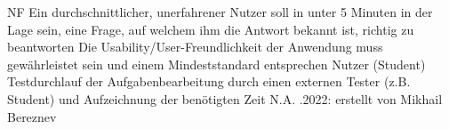\begin{myreq}
    \threeinline
    {\reqno}
    {\reqtype NF}
    {}
    \reqdesc Ein durchschnittlicher, unerfahrener Nutzer soll in unter 5 Minuten in der Lage sein, eine Frage, auf welchem ihm die Antwort bekannt ist, richtig zu beantworten
    \reqrat Die Usability/User-Freundlichkeit der Anwendung muss gewährleistet sein und einem Mindeststandard entsprechen
    \reqorig Nutzer (Student)
    \reqfit Testdurchlauf der Aufgabenbearbeitung durch einen externen Tester (z.B. Student) und Aufzeichnung der benötigten Zeit
    \twoinline
    {}
    {}
    \twoinline
    {}
    {\reqconf N.A.}
    \reqmater
    .2022: erstellt von Mikhail Bereznev
\end{myreq}